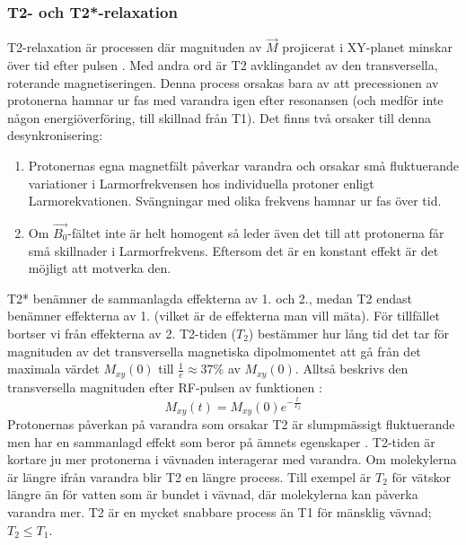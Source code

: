 \documentclass[11pt, a4paper]{article}
\begin{document}
\subsubsection{T2- och T2*-relaxation}
T2-relaxation är processen där magnituden av $\vec{M}$ projicerat i XY-planet minskar över tid efter pulsen \parencite{understanding_mri}. Med andra ord är T2 avklingandet av den transversella, roterande magnetiseringen. Denna process orsakas bara av att precessionen av protonerna hamnar ur fas med varandra igen efter resonansen (och medför inte någon energiöverföring, till skillnad från T1). Det finns två orsaker till denna desynkronisering:
\begin{enumerate}
	\item Protonernas egna magnetfält påverkar varandra och orsakar små fluktuerande variationer i Larmorfrekvensen hos individuella protoner enligt Larmorekvationen. Svängningar med olika frekvens hamnar ur fas över tid.
	\item Om $\vec{B_0}$-fältet inte är helt homogent så leder även det till att protonerna får små skillnader i Larmorfrekvens. Eftersom det är en konstant effekt är det möjligt att motverka den.
\end{enumerate}
T2* benämner de sammanlagda effekterna av 1. och 2., medan T2 endast benämner effekterna av 1. (vilket är de effekterna man vill mäta). För tillfället bortser vi från effekterna av 2. T2-tiden ($T_2$) bestämmer hur lång tid det tar för magnituden av det transversella magnetiska dipolmomentet att gå från det maximala värdet $M_{xy}(0)$ till $\frac{1}{e}\approx37\%$ av $M_{xy}(0)$. Alltså beskrivs den transversella magnituden efter RF-pulsen av funktionen \parencite[s. 59]{mri_lärobok}:
\begin{equation}\label{eq:t2_magnitude}
	M_{xy}(t)=M_{xy}(0)e^{-\frac{t}{T_2}}
\end{equation}
Protonernas påverkan på varandra som orsakar T2 är slumpmässigt fluktuerande men har en sammanlagd effekt som beror på ämnets egenskaper \parencite{understanding_mri}. T2-tiden är kortare ju mer protonerna i vävnaden interagerar med varandra. Om molekylerna är längre ifrån varandra blir T2 en längre process. Till exempel är $T_2$ för vätskor längre än för vatten som är bundet i vävnad, där molekylerna kan påverka varandra mer. T2 är en mycket snabbare process än T1 för mänsklig vävnad; $T_2\leq T_1$.
\end{document}
